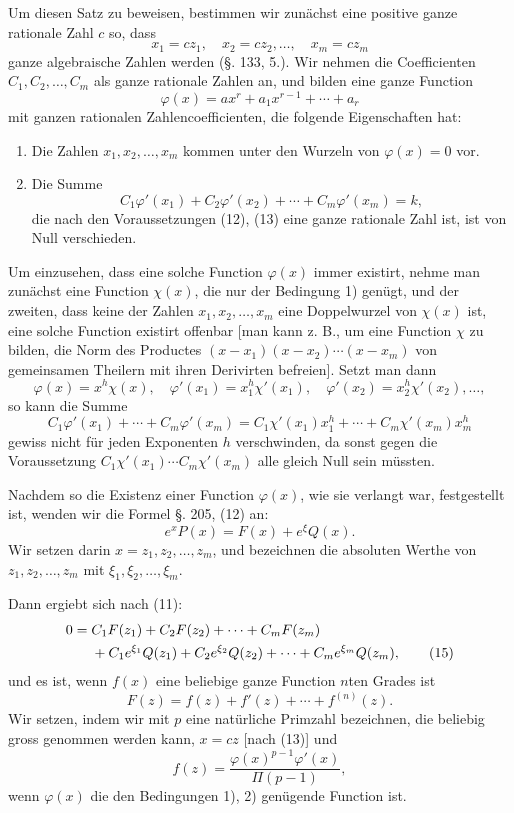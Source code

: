 \documentclass[11pt]{article}
\begin{document}
Um diesen Satz zu beweisen, bestimmen wir zunächst eine positive ganze rationale Zahl $c$ so, dass
\begin{equation}\tag{13}
x_1=cz_1,\quad x_2=cz_2,\ldots,\quad x_m=cz_m
\end{equation}
ganze algebraische Zahlen werden (§. 133, 5.). Wir nehmen die Coefficienten $C_1,C_2,\ldots,C_m$ als ganze rationale Zahlen an, und bilden eine ganze Function
\begin{equation}\tag{14}
\varphi(x)=ax^r+a_1x^{r-1}+\cdots+a_r
\end{equation}
mit ganzen rationalen Zahlencoefficienten, die folgende Eigenschaften hat:
\begin{enumerate}[label=\arabic*)]
\item Die Zahlen $x_1,x_2,\ldots,x_m$ kommen unter den Wurzeln von $\varphi(x)=0$ vor.
\item Die Summe
\[
C_1\varphi'(x_1)+C_2\varphi'(x_2)+\cdots+C_m\varphi'(x_m)=k,
\]
die nach den Voraussetzungen (12), (13) eine ganze rationale Zahl ist, ist von Null verschieden.
\end{enumerate}

Um einzusehen, dass eine solche Function $\varphi(x)$ immer existirt, nehme man zunächst eine Function $\chi(x)$, die nur der Bedingung 1) genügt, und der zweiten, dass keine der Zahlen $x_1,x_2,\ldots,x_m$ eine Doppelwurzel von $\chi(x)$ ist, eine solche Function existirt offenbar [man kann z. B., um eine Function $\chi$ zu bilden, die Norm des Productes $(x-x_1)(x-x_2)\cdots(x-x_m)$ von gemeinsamen Theilern mit ihren Derivirten befreien]. Setzt man dann
\[
\varphi(x)=x^h\chi(x),\quad
\varphi'(x_1)=x_1^h\chi'(x_1),\quad
\varphi'(x_2)=x_2^h\chi'(x_2),\ldots,
\]
so kann die Summe
\[
C_1\varphi'(x_1)+\cdots+C_m\varphi'(x_m)
=
C_1\chi'(x_1)x_1^h+\cdots+C_m\chi'(x_m)x_m^h
\]
gewiss nicht für jeden Exponenten $h$ verschwinden, da sonst gegen die Voraussetzung $C_1\chi'(x_1)\cdots C_m\chi'(x_m)$ alle gleich Null sein müssten.

Nachdem so die Existenz einer Function $\varphi(x)$, wie sie verlangt war, festgestellt ist, wenden wir die Formel §. 205, (12) an:
\[
e^xP(x)=F(x)+e^\xi Q(x).
\]
Wir setzen darin $x=z_1,z_2,\ldots,z_m$, und bezeichnen die absoluten Werthe von $z_1,z_2,\ldots,z_m$ mit $\xi_1,\xi_2,\ldots,\xi_m$.

Dann ergiebt sich nach (11):
\begin{align}
0={}&C_1F(z_1)+C_2F(z_2)+\cdots+C_mF(z_m)\notag\\
&+C_1e^{\xi_1}Q(z_1)+C_2e^{\xi_2}Q(z_2)+\cdots+C_me^{\xi_m}Q(z_m),
\tag{15}
\end{align}
und es ist, wenn $f(x)$ eine beliebige ganze Function $n$ten Grades ist
\begin{equation}\tag{16}
F(z)=f(z)+f'(z)+\cdots+f^{(n)}(z).
\end{equation}
Wir setzen, indem wir mit $p$ eine natürliche Primzahl bezeichnen, die beliebig gross genommen werden kann, $x=cz$ [nach (13)] und
\begin{equation}\tag{17}
f(z)=\frac{\varphi(x)^{p-1}\varphi'(x)}{\Pi(p-1)},
\end{equation}
wenn $\varphi(x)$ die den Bedingungen 1), 2) genügende Function ist.
\end{document}
